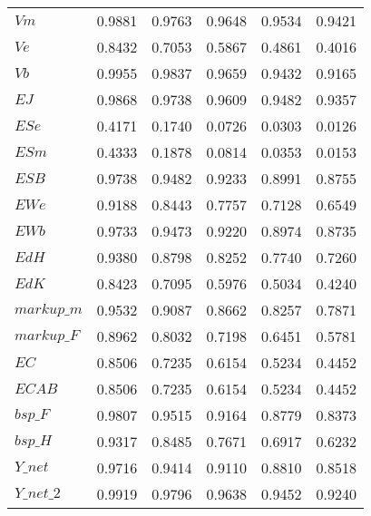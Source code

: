 \begin{center}
\begin{longtable}{lccccc}
$Vm                 $	 & 	    0.9881	 & 	    0.9763	 & 	    0.9648	 & 	    0.9534	 & 	    0.9421 \\ 
$Ve                 $	 & 	    0.8432	 & 	    0.7053	 & 	    0.5867	 & 	    0.4861	 & 	    0.4016 \\ 
$Vb                 $	 & 	    0.9955	 & 	    0.9837	 & 	    0.9659	 & 	    0.9432	 & 	    0.9165 \\ 
$EJ                 $	 & 	    0.9868	 & 	    0.9738	 & 	    0.9609	 & 	    0.9482	 & 	    0.9357 \\ 
$ESe                $	 & 	    0.4171	 & 	    0.1740	 & 	    0.0726	 & 	    0.0303	 & 	    0.0126 \\ 
$ESm                $	 & 	    0.4333	 & 	    0.1878	 & 	    0.0814	 & 	    0.0353	 & 	    0.0153 \\ 
$ESB                $	 & 	    0.9738	 & 	    0.9482	 & 	    0.9233	 & 	    0.8991	 & 	    0.8755 \\ 
$EWe                $	 & 	    0.9188	 & 	    0.8443	 & 	    0.7757	 & 	    0.7128	 & 	    0.6549 \\ 
$EWb                $	 & 	    0.9733	 & 	    0.9473	 & 	    0.9220	 & 	    0.8974	 & 	    0.8735 \\ 
$EdH                $	 & 	    0.9380	 & 	    0.8798	 & 	    0.8252	 & 	    0.7740	 & 	    0.7260 \\ 
$EdK                $	 & 	    0.8423	 & 	    0.7095	 & 	    0.5976	 & 	    0.5034	 & 	    0.4240 \\ 
$markup\_m          $	 & 	    0.9532	 & 	    0.9087	 & 	    0.8662	 & 	    0.8257	 & 	    0.7871 \\ 
$markup\_F          $	 & 	    0.8962	 & 	    0.8032	 & 	    0.7198	 & 	    0.6451	 & 	    0.5781 \\ 
$EC                 $	 & 	    0.8506	 & 	    0.7235	 & 	    0.6154	 & 	    0.5234	 & 	    0.4452 \\ 
$ECAB               $	 & 	    0.8506	 & 	    0.7235	 & 	    0.6154	 & 	    0.5234	 & 	    0.4452 \\ 
$bsp\_F             $	 & 	    0.9807	 & 	    0.9515	 & 	    0.9164	 & 	    0.8779	 & 	    0.8373 \\ 
$bsp\_H             $	 & 	    0.9317	 & 	    0.8485	 & 	    0.7671	 & 	    0.6917	 & 	    0.6232 \\ 
$Y\_net             $	 & 	    0.9716	 & 	    0.9414	 & 	    0.9110	 & 	    0.8810	 & 	    0.8518 \\ 
$Y\_net\_2          $	 & 	    0.9919	 & 	    0.9796	 & 	    0.9638	 & 	    0.9452	 & 	    0.9240 \\ 

\end{longtable}
\end{center}
